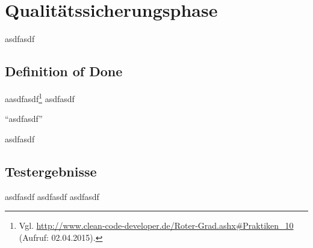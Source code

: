 \section{Qualitätssicherungsphase}
\label{sec:Qualitätssicherungsphase}
asdfasdf

\subsection{Definition of Done}
\label{sub:Definition of Done}
aasdfasdf\footnote{Vgl. \url{http://www.clean-code-developer.de/Roter-Grad.ashx\#Praktiken_10} (Aufruf: 02.04.2015).} asdfasdf

"`asdfasdf"'

asdfasdf

\begingroup
\setlength\intextsep{0pt}


\subsection{Testergebnisse}
\label{sub:Testergebnisse}
asdfasdf asdfasdf  asdfasdf
